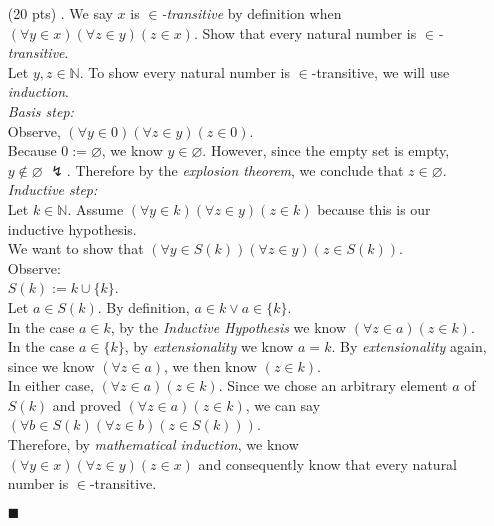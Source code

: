 \documentclass[11pt,a4paper]{article}
\begin{document}
\begin{enumerate}
    \item[(20 pts) \quad 6.]
    We say $x$ is \emph{$\in$-transitive} by definition when $(\forall y \in x)(\forall z \in y)(z \in x) $.
    Show that every natural number is \emph{$\in$-transitive}. \\
    Let $y, z \in \mathbb{N} $. To show every natural number is $\in $-transitive, we will use \emph{induction}. \\
    \emph{Basis step:} \\
    Observe, $(\forall y \in 0)(\forall z \in y)(z \in 0) $. \\
    Because $0 := \varnothing $, we know $y \in \varnothing $. However, since the empty set is empty, $y \notin \varnothing $ $\lightning$. Therefore by the \emph{explosion theorem}, we conclude that $z \in \varnothing $. \\
    \emph{Inductive step:} \\
    Let $k \in \mathbb{N} $. Assume $(\forall y \in k)(\forall z \in y)(z \in k) $ because this is our inductive hypothesis. \\
    We want to show that $(\forall y \in S(k))(\forall z \in y)(z \in S(k)) $. \\
    Observe: \\
    $S(k) := k \cup \{k\}$. \\ 
    Let $a \in S(k) $. By definition, $a \in k \lor a \in \{k\} $. \\
    In the case $a \in k $, by the \emph{Inductive Hypothesis} we know $(\forall z \in a)(z \in k) $. \\
    In the case $a \in \{k\} $, by \emph{extensionality} we know $a = k $. By \emph{extensionality} again, since we know $(\forall z \in a)$, we then know $(z \in k) $.  \\
    In either case, $(\forall z \in a)(z \in k) $. Since we chose an arbitrary element $a$ of $S(k) $ and proved $(\forall z \in a)(z \in k) $, 
    we can say $(\forall b \in S(k)(\forall z \in b)(z \in S(k))) $. \\
    Therefore, by \emph{mathematical induction}, we know $(\forall y \in x)(\forall z \in y)(z \in x) $ and consequently know that every natural number is $\in$-transitive.
    \begin{flushright}
        $\blacksquare$
    \end{flushright}

\end{enumerate}
\end{document}

